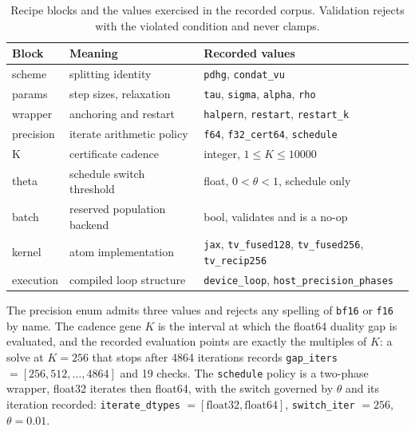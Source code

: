 \begin{table}[t]
\centering
\caption{Recipe blocks and the values exercised in the recorded corpus.
Validation rejects with the violated condition and never clamps.}
\label{tab:recipe}
\begin{tabular}{@{}lll@{}}
\toprule
Block & Meaning & Recorded values \\
\midrule
scheme    & splitting identity        & \texttt{pdhg}, \texttt{condat\_vu} \\
params    & step sizes, relaxation    & \texttt{tau}, \texttt{sigma}, \texttt{alpha}, \texttt{rho} \\
wrapper   & anchoring and restart     & \texttt{halpern}, \texttt{restart}, \texttt{restart\_k} \\
precision & iterate arithmetic policy & \texttt{f64}, \texttt{f32\_cert64}, \texttt{schedule} \\
K         & certificate cadence       & integer, $1 \le K \le 10000$ \\
theta     & schedule switch threshold & float, $0 < \theta < 1$, schedule only \\
batch     & reserved population backend & bool, validates and is a no-op \\
kernel    & atom implementation       & \texttt{jax}, \texttt{tv\_fused128}, \texttt{tv\_fused256}, \texttt{tv\_recip256} \\
execution & compiled loop structure   & \texttt{device\_loop}, \texttt{host\_precision\_phases} \\
\bottomrule
\end{tabular}
\end{table}

The precision enum admits three values and rejects any spelling of
\texttt{bf16} or \texttt{f16} by name. The cadence gene $K$ is the interval at
which the float64 duality gap is evaluated, and the recorded evaluation points
are exactly the multiples of $K$: a solve at $K=256$ that stops after 4864
iterations records \texttt{gap\_iters} $= [256, 512, \ldots, 4864]$ and 19
checks.
The \texttt{schedule} policy is a two-phase wrapper, float32 iterates then
float64, with the switch governed by $\theta$ and its iteration recorded:
\texttt{iterate\_dtypes} $=[\text{float32},\text{float64}]$,
\texttt{switch\_iter} $=256$, $\theta = 0.01$.

